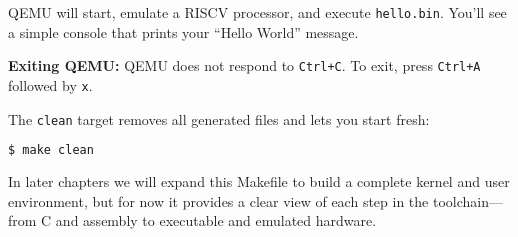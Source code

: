 QEMU will start, emulate a RISC\textendash V processor, and execute
\texttt{hello.bin}.  You’ll see a simple console that prints your
``Hello World'' message.

\medskip
\noindent
\textbf{Exiting QEMU:}  
QEMU does not respond to \texttt{Ctrl+C}.  
To exit, press \texttt{Ctrl+A} followed by \texttt{x}.

\medskip
The \texttt{clean} target removes all generated files and lets you start fresh:

\begin{lstlisting}[style=oscode,language=bash]
$ make clean
\end{lstlisting}

In later chapters we will expand this Makefile to build a complete kernel and
user environment, but for now it provides a clear view of each step in the
toolchain—from C and assembly to executable and emulated hardware.
